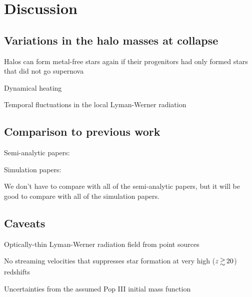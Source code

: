 \documentclass[a4paper,fleqn,usenatbib]{mnras}
\begin{document}
\section{Discussion}

\subsection{Variations in the halo masses at collapse}

\li Halos can form metal-free stars again if their progenitors had
only formed stars that did not go supernova

\li Dynamical heating \citep{Yoshida03}

\li Temporal fluctuations in the local Lyman-Werner radiation

\subsection{Comparison to previous work}

\li Semi-analytic papers: \citep{Tegmark97, Trenti09, Visbal18,
  Mebane18, Griffen18}

\li Simulation papers: \citep{Machacek01, Yoshida03, Wise07_UVB,
  OShea08, Muratov13}

\li We don't have to compare with all of the semi-analytic papers, but
it will be good to compare with all of the simulation papers.

\subsection{Caveats}

\li Optically-thin Lyman-Werner radiation field from point sources \citep{Schauer17}

\li No streaming velocities that suppresses star formation at very
high ($z \ga 20$) redshifts \citep{Tselia11, Greif11_Delay, Naoz12, OLeary12}

\li Uncertainties from the assumed Pop III initial mass function 
\end{document}
